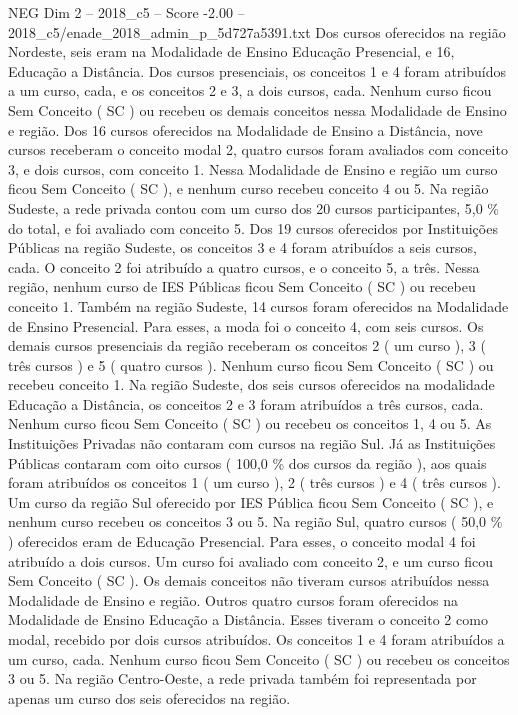 \begin{textsample}{NEG Dim 2 – 2018\_c5 – Score -2.00 – 2018\_c5/enade\_2018\_admin\_p\_5d727a5391.txt}
Dos cursos oferecidos na região Nordeste, seis eram na Modalidade de Ensino Educação Presencial, e 16, Educação a Distância.
Dos cursos presenciais, os conceitos 1 e 4 foram atribuídos a um curso, cada, e os conceitos 2 e 3, a dois cursos, cada.
Nenhum curso ficou Sem Conceito ( SC ) ou recebeu os demais conceitos nessa Modalidade de Ensino e região.
Dos 16 cursos oferecidos na Modalidade de Ensino a Distância, nove cursos receberam o conceito modal 2, quatro cursos foram avaliados com conceito 3, e dois cursos, com conceito 1.
Nessa Modalidade de Ensino e região um curso ficou Sem Conceito ( SC ), e nenhum curso recebeu conceito 4 ou 5.
Na região Sudeste, a rede privada contou com um curso dos 20 cursos participantes, 5,0 \% do total, e foi avaliado com conceito 5.
Dos 19 cursos oferecidos por Instituições Públicas na região Sudeste, os conceitos 3 e 4 foram atribuídos a seis cursos, cada.
O conceito 2 foi atribuído a quatro cursos, e o conceito 5, a três.
Nessa região, nenhum curso de IES Públicas ficou Sem Conceito ( SC ) ou recebeu conceito 1.
Também na região Sudeste, 14 cursos foram oferecidos na Modalidade de Ensino Presencial.
Para esses, a moda foi o conceito 4, com seis cursos.
Os demais cursos presenciais da região receberam os conceitos 2 ( um curso ), 3 ( três cursos ) e 5 ( quatro cursos ).
Nenhum curso ficou Sem Conceito ( SC ) ou recebeu conceito 1.
Na região Sudeste, dos seis cursos oferecidos na modalidade Educação a Distância, os conceitos 2 e 3 foram atribuídos a três cursos, cada.
Nenhum curso ficou Sem Conceito ( SC ) ou recebeu os conceitos 1, 4 ou 5.
As Instituições Privadas não contaram com cursos na região Sul.
Já as Instituições Públicas contaram com oito cursos ( 100,0 \% dos cursos da região ), aos quais foram atribuídos os conceitos 1 ( um curso ), 2 ( três cursos ) e 4 ( três cursos ).
Um curso da região Sul oferecido por IES Pública ficou Sem Conceito ( SC ), e nenhum curso recebeu os conceitos 3 ou 5.
Na região Sul, quatro cursos ( 50,0 \% ) oferecidos eram de Educação Presencial.
Para esses, o conceito modal 4 foi atribuído a dois cursos.
Um curso foi avaliado com conceito 2, e um curso ficou Sem Conceito ( SC ).
Os demais conceitos não tiveram cursos atribuídos nessa Modalidade de Ensino e região.
Outros quatro cursos foram oferecidos na Modalidade de Ensino Educação a Distância.
Esses tiveram o conceito 2 como modal, recebido por dois cursos atribuídos.
Os conceitos 1 e 4 foram atribuídos a um curso, cada.
Nenhum curso ficou Sem Conceito ( SC ) ou recebeu os conceitos 3 ou 5.
Na região Centro-Oeste, a rede privada também foi representada por apenas um curso dos seis oferecidos na região.

\end{textsample}

